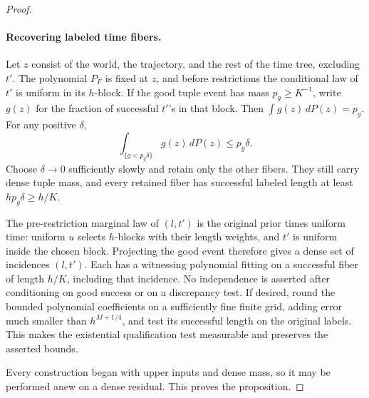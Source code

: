 \begin{proof}
\paragraph{Recovering labeled time fibers.}
Let \(z\) consist of the world, the trajectory, and the rest of the
time tree, excluding \(t'\).
The polynomial \(P_F\) is fixed at \(z\), and before restrictions
the conditional law of \(t'\) is uniform in its \(h\)-block.
If the good tuple event has mass \(p_g\ge K^{-1}\), write
\(g(z)\) for the fraction of successful \(t'\)'s in that block.
Then \(\int g(z)\,dP(z)=p_g\).
For any positive \(\delta\),
\[
 \int_{\{g<p_g\delta\}}g(z)\,dP(z)\le p_g\delta.
\]
Choose \(\delta\to0\) sufficiently slowly and retain only the other
fibers.  They still carry dense tuple mass, and every retained fiber
has successful labeled length at least \(hp_g\delta\ge h/K\).

The pre-restriction marginal law of \((l,t')\) is the original prior
times uniform time: uniform \(u\) selects \(h\)-blocks with their length
weights, and \(t'\) is uniform inside the chosen block.
Projecting the good event therefore gives a dense set of incidences
\((l,t')\).  Each has a witnessing polynomial fitting on a successful
fiber of length \(h/K\), including that incidence.
No independence is asserted after conditioning on good success or
on a discrepancy test.
If desired, round the bounded polynomial coefficients on a sufficiently
fine finite grid, adding error much smaller than \(h^{M+1/4}\), and test
its successful length on the original labels.
This makes the existential qualification test measurable and preserves
the asserted bounds.

Every construction began with upper inputs and dense mass, so it may
be performed anew on a dense residual.  This proves the proposition.
\end{proof}
